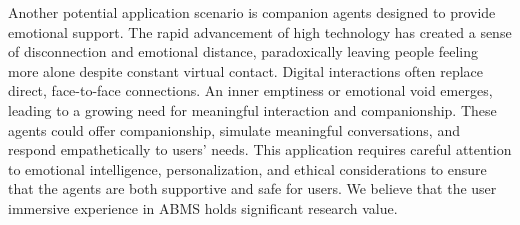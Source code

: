 Another potential application scenario is companion agents designed to provide emotional support. 
The rapid advancement of high technology has created a sense of disconnection and emotional distance, paradoxically leaving people feeling more alone despite constant virtual contact. 
Digital interactions often replace direct, face-to-face connections.
An inner emptiness or emotional void emerges, leading to a growing need for meaningful interaction and companionship.
These agents could offer companionship, simulate meaningful conversations, and respond empathetically to users' needs.
This application requires careful attention to emotional intelligence, personalization, and ethical considerations to ensure that the agents are both supportive and safe for users.
We believe that the user immersive experience in ABMS holds significant research value.
